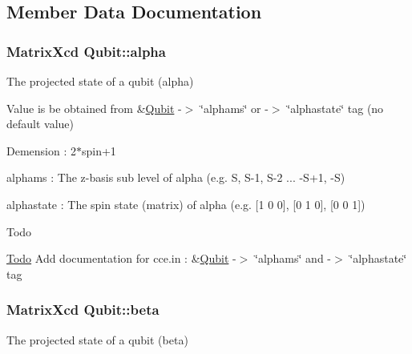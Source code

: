 \subsection{Member Data Documentation}
\hypertarget{structQubit_accc3b309d802ab6f269b7d8a7536a4a0}{
\subsubsection[{alpha}]{\setlength{\rightskip}{0pt plus 5cm}Matrix\-Xcd Qubit\-::alpha}}\label{structQubit_accc3b309d802ab6f269b7d8a7536a4a0}


The projected state of a qubit (alpha) 

Value is be obtained from \&\hyperlink{structQubit}{Qubit} -\/$>$ \char`\"{}alphams\char`\"{} or -\/$>$ \char`\"{}alphastate\char`\"{} tag (no default value)
\begin{DoxyItemize}
\item Demension \-: 2$\ast$spin+1
\item alphams \-: The z-\/basis sub level of alpha (e.\-g. S, S-\/1, S-\/2 ... -\/\-S+1, -\/\-S)
\item alphastate \-: The spin state (matrix) of alpha (e.\-g. \mbox{[}1 0 0\mbox{]}, \mbox{[}0 1 0\mbox{]}, \mbox{[}0 0 1\mbox{]}) \begin{DoxyRefDesc}{Todo}
\item[\hyperlink{todo__todo000023}{Todo}]Add documentation for cce.\-in \-: \&\hyperlink{structQubit}{Qubit} -\/$>$ \char`\"{}alphams\char`\"{} and -\/$>$ \char`\"{}alphastate\char`\"{} tag \end{DoxyRefDesc}

\end{DoxyItemize}\hypertarget{structQubit_a6c73eb8c49fdb6db06179b21b5a2923d}{
\subsubsection[{beta}]{\setlength{\rightskip}{0pt plus 5cm}Matrix\-Xcd Qubit\-::beta}}\label{structQubit_a6c73eb8c49fdb6db06179b21b5a2923d}


The projected state of a qubit (beta) 

